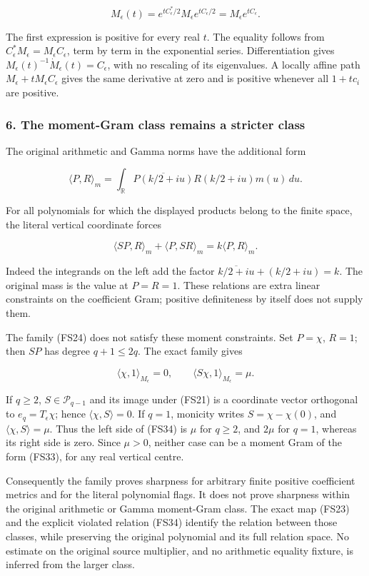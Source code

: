 \documentclass{article}
\begin{document}
\[
M_\epsilon(t)
=e^{tC_\epsilon^*/2}M_\epsilon e^{tC_\epsilon/2}
=M_\epsilon e^{tC_\epsilon}.
\tag{FS32}
\]

The first expression is positive for every real \(t\). The equality follows from \(C_\epsilon^*M_\epsilon=M_\epsilon C_\epsilon\), term by term in the exponential series. Differentiation gives \(M_\epsilon(t)^{-1}\dot M_\epsilon(t)=C_\epsilon\), with no rescaling of its eigenvalues. A locally affine path \(M_\epsilon+tM_\epsilon C_\epsilon\) gives the same derivative at zero and is positive whenever all \(1+tc_i\) are positive.

\subsubsection{6. The moment-Gram class remains a stricter class}\label{endpoint-four_window_sharpness--the-moment-gram-class-remains-a-stricter-class}

The original arithmetic and Gamma norms have the additional form

\[
\langle P,R\rangle_m
=\int_{\mathbb R}\overline{P(k/2+iu)}R(k/2+iu)m(u)\,du.
\tag{FS33}
\]

For all polynomials for which the displayed products belong to the finite space, the literal vertical coordinate forces

\[
\langle SP,R\rangle_m+\langle P,SR\rangle_m
=k\langle P,R\rangle_m.
\tag{FS34}
\]

Indeed the integrands on the left add the factor \(\overline{k/2+iu}+(k/2+iu)=k\). The original mass is the value at \(P=R=1\). These relations are extra linear constraints on the coefficient Gram; positive definiteness by itself does not supply them.

The family (FS24) does not satisfy these moment constraints. Set \(P=\chi\), \(R=1\); then \(SP\) has degree \(q+1\le2q\). The exact family gives

\[
\langle\chi,1\rangle_{M_\epsilon}=0,
\qquad
\langle S\chi,1\rangle_{M_\epsilon}=\mu.
\tag{FS35}
\]

If \(q\ge2\), \(S\in\mathcal P_{q-1}\) and its image under (FS21) is a coordinate vector orthogonal to \(e_q=T_\epsilon\chi\); hence \(\langle\chi,S\rangle=0\). If \(q=1\), monicity writes \(S=\chi-\chi(0)\), and \(\langle\chi,S\rangle=\mu\). Thus the left side of (FS34) is \(\mu\) for \(q\ge2\), and \(2\mu\) for \(q=1\), whereas its right side is zero. Since \(\mu>0\), neither case can be a moment Gram of the form (FS33), for any real vertical centre.

Consequently the family proves sharpness for arbitrary finite positive coefficient metrics and for the literal polynomial flags. It does not prove sharpness within the original arithmetic or Gamma moment-Gram class. The exact map (FS23) and the explicit violated relation (FS34) identify the relation between those classes, while preserving the original polynomial and its full relation space. No estimate on the original source multiplier, and no arithmetic equality fixture, is inferred from the larger class.

\endgroup
\end{document}
